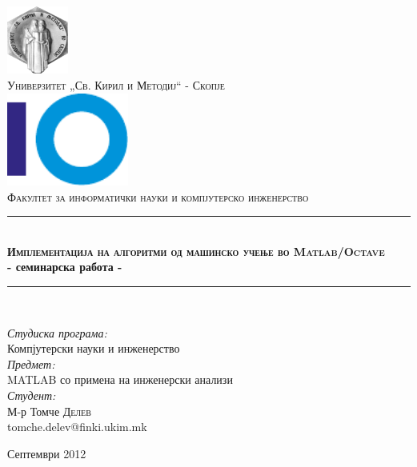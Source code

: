 \begin{titlepage}
\begin{center}
\newcommand{\HRule}{\rule{\linewidth}{0.5mm}}

\includegraphics[width=0.15\textwidth]{images/ukim}\\[1cm]
\textsc{\large Универзитет „Св. Кирил и Методиј“ - Скопје}\\[1.5cm]

\includegraphics[width=0.3\textwidth]{images/finki_logo}\\[1cm]
\textsc{\large Факултет за информатички науки и компјутерско
инженерство}\\[1.5cm]

\HRule \\[0.4cm]
{  \bfseries \textsc{Имплементација на алгоритми од машинско учење во
Matlab/Octave} \\[0.4cm] - семинарска работа -}
\\[0.4cm]

\HRule \\[1.5cm]

\begin{flushleft} 
\emph{Студиска програма:}\\
Компјутерски науки и инженерство\\
\emph{Предмет:}\\
MATLAB со примена на инженерски анализи\\
\emph{Студент:}\\
М-р Томче \textsc{Делев}\\
tomche.delev@finki.ukim.mk
\end{flushleft}

\vfill

{\large Септември 2012}

\end{center}
\end{titlepage}